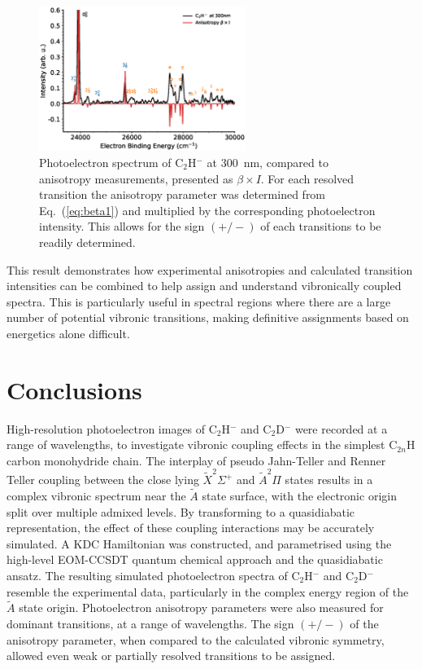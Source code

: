 \documentclass[aip,graphicx]{revtex4-1}
\begin{document}
\begin{figure}[th!]
	\includegraphics[width=0.6\textwidth]{figures/Fig6}
	\caption{Photoelectron spectrum of C$_2$H$^-$ at 300~nm, compared to anisotropy measurements, presented as $\beta\times I$. For each resolved transition the anisotropy parameter was determined from Eq.~(\ref{eq:beta1}) and multiplied by the corresponding photoelectron intensity. This allows for the sign $(+/-)$ of each transitions to be readily determined.}
	\label{fig:6}
\end{figure}

This result demonstrates how experimental anisotropies and calculated transition intensities can be combined to help assign and understand vibronically coupled spectra. This is particularly useful in spectral regions where there are a large number of potential vibronic transitions, making definitive assignments based on energetics alone difficult.



\section{Conclusions} 
High-resolution photoelectron images of C$_2$H$^-$ and C$_2$D$^-$ were recorded at a range of wavelengths, to investigate vibronic coupling effects in the simplest C$_{2n}$H carbon monohydride chain. The interplay of pseudo Jahn-Teller and Renner Teller coupling between the close lying $\tilde{X}^2\Sigma^+$ and $\tilde{A}^2\Pi$ states results in a complex vibronic spectrum near the $\tilde{A}$ state surface, with the electronic origin split over multiple admixed levels. By transforming to a quasidiabatic representation, the effect of these coupling interactions may be accurately simulated. A KDC Hamiltonian was constructed, and parametrised using the high-level EOM-CCSDT quantum chemical approach and the quasidiabatic ansatz. The resulting simulated photoelectron spectra of C$_2$H$^-$ and C$_2$D$^-$ resemble the experimental data, particularly in the complex energy region of the $\tilde{A}$ state origin. Photoelectron anisotropy parameters were also measured for dominant transitions, at a range of wavelengths. The sign $(+/-)$ of the anisotropy parameter, when compared to the calculated vibronic symmetry, allowed even weak or partially resolved transitions to be assigned.
\end{document}
